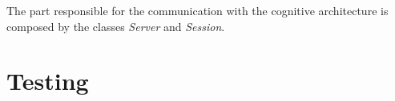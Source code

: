 	The part responsible for the communication with the cognitive architecture is composed by the classes \emph{Server} and \emph{Session}. 
	


 
	\section{Testing}

